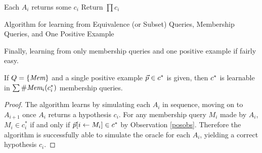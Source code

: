 \begin{algorithm}[H]
\label{lineqalg}
\SetAlgoLined
{}
Each $A_i$ returns some $c_i$\;
Return $\prod c_i$\;
\caption{Algorithm for learning from Equivalence (or Subset)  Queries, Membership Queries, and One Positive Example}
\end{algorithm}


Finally, learning from only membership queries and one positive example if fairly easy. 

\begin{proposition}
\label{memandpos}
If $Q = \{\emph{Mem}\}$ and a single positive example $\vec{p} \in c^*$ is given, then $c^*$ is learnable in $\sum \#\emph{Mem}_{i}(c^*_i)$ membership queries.  
\end{proposition}
\begin{proof}
The algorithm learns by simulating each $A_i$ in sequence, moving on to $A_{i+1}$ once $A_i$ returns a hypothesis $c_i$. 
For any membership query $M_i$ made by $A_i$, $M_i \in c^*_i$ if and only if $\vec{p}[i \leftarrow M_i]\in c^*$ by Observation \ref{posobs}. 
Therefore the algorithm is successfully able to simulate the oracle for each $A_i$, yielding a correct hypothesis $c_i$. 
\end{proof}

